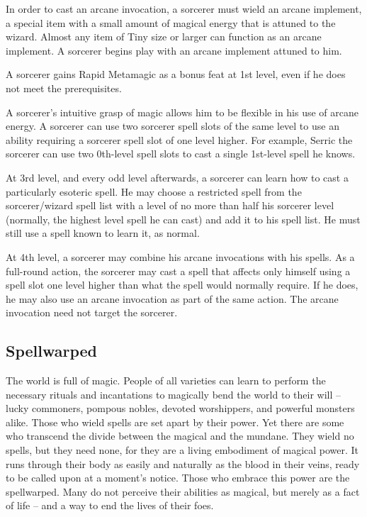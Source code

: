 In order to cast an arcane invocation, a sorcerer must wield an arcane implement, a special item with a small amount of magical energy that is attuned to the wizard. Almost any item of Tiny size or larger can function as an arcane implement. A sorcerer begins play with an arcane implement attuned to him.

 A sorcerer gains Rapid Metamagic as a bonus feat at 1st level, even if he does not meet the prerequisites.

 A sorcerer's intuitive grasp of magic allows him to be flexible in his use of arcane energy. A sorcerer can use two sorcerer spell slots of the same level to use an ability requiring a sorcerer spell slot of one level higher. For example, Serric the sorcerer can use two 0th-level spell slots to cast a single 1st-level spell he knows.

 At 3rd level, and every odd level afterwards, a sorcerer can learn how to cast a particularly esoteric spell. He may choose a restricted spell from the sorcerer/wizard spell list with a level of no more than half his sorcerer level (normally, the highest level spell he can cast) and add it to his spell list. He must still use a spell known to learn it, as normal.

 At 4th level, a sorcerer may combine his arcane invocations with his spells. As a full-round action, the sorcerer may cast a spell that affects only himself using a spell slot one level higher than what the spell would normally require. If he does, he may also use an arcane invocation as part of the same action. The arcane invocation need not target the sorcerer.

\subsection{Spellwarped}
The world is full of magic. People of all varieties can learn to perform the necessary rituals and incantations to magically bend the world to their will -- lucky commoners, pompous nobles, devoted worshippers, and powerful monsters alike. Those who wield spells are set apart by their power. Yet there are some who transcend the divide between the magical and the mundane. They wield no spells, but they need none, for they are a living embodiment of magical power. It runs through their body as easily and naturally as the blood in their veins, ready to be called upon at a moment's notice. Those who embrace this power are the spellwarped. Many do not perceive their abilities as magical, but merely as a fact of life -- and a way to end the lives of their foes.

